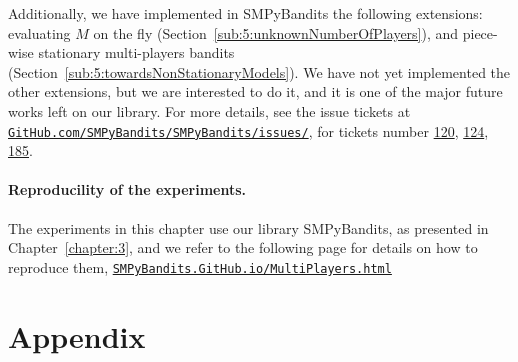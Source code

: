 Additionally, we have implemented in SMPyBandits \cite{SMPyBandits} the following extensions: evaluating $M$ on the fly (Section~\ref{sub:5:unknownNumberOfPlayers}), and piece-wise stationary multi-players bandits (Section~\ref{sub:5:towardsNonStationaryModels}).
We have not yet implemented the other extensions, but we are interested to do it, and it is one of the major future works left on our library.
For more details, see the issue tickets at \href{https://github.com/SMPyBandits/SMPyBandits/issues/}{\texttt{GitHub.com/SMPyBandits/SMPyBandits/issues/}}, for tickets number \href{https://github.com/SMPyBandits/SMPyBandits/issues/120}{120}, \href{https://github.com/SMPyBandits/SMPyBandits/issues/124}{124}, \href{https://github.com/SMPyBandits/SMPyBandits/issues/185}{185}.

\paragraph{Reproducility of the experiments.}

The experiments in this chapter use our library SMPyBandits, as presented in Chapter~\ref{chapter:3},
and we refer to the following page for details on how to reproduce them,
\href{https://SMPyBandits.GitHub.io/MultiPlayers.html}{\texttt{SMPyBandits.GitHub.io/MultiPlayers.html}}






\newpage
\section{Appendix}
\label{sec:5:appendix}




